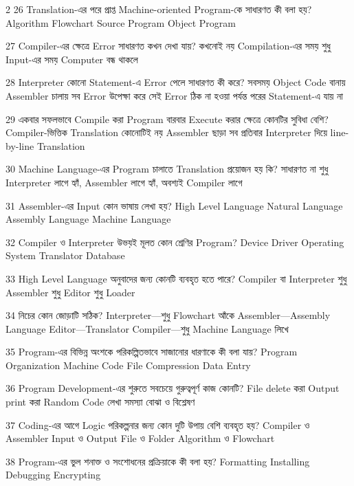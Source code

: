 \begin{multicols}{2}
\mcq
{26}
{Translation-এর পরে প্রাপ্ত Machine-oriented Program-কে সাধারণত কী বলা হয়?}
{Algorithm}
{Flowchart}
{Source Program}
{Object Program}

\mcq
{27}
{Compiler-এর ক্ষেত্রে Error সাধারণত কখন দেখা যায়?}
{কখনোই নয়}
{Compilation-এর সময়}
{শুধু Input-এর সময়}
{Computer বন্ধ থাকলে}

\mcqwide
{28}
{Interpreter কোনো Statement-এ Error পেলে সাধারণত কী করে?}
{সবসময় Object Code বানায়}
{Assembler চালায়}
{সব Error উপেক্ষা করে}
{সেই Error ঠিক না হওয়া পর্যন্ত পরের Statement-এ যায় না}

\mcqwide
{29}
{একবার সফলভাবে Compile করা Program বারবার Execute করার ক্ষেত্রে কোনটির সুবিধা বেশি?}
{Compiler-ভিত্তিক Translation}
{কোনোটিই নয়}
{Assembler ছাড়া সব}
{প্রতিবার Interpreter দিয়ে line-by-line Translation}

\mcqwide
{30}
{Machine Language-এর Program চালাতে Translation প্রয়োজন হয় কি?}
{সাধারণত না}
{শুধু Interpreter লাগে}
{হ্যাঁ, Assembler লাগে}
{হ্যাঁ, অবশ্যই Compiler লাগে}

\mcq
{31}
{Assembler-এর Input কোন ভাষায় লেখা হয়?}
{High Level Language}
{Natural Language}
{Assembly Language}
{Machine Language}

\mcq
{32}
{Compiler ও Interpreter উভয়ই মূলত কোন শ্রেণির Program?}
{Device Driver}
{Operating System}
{Translator}
{Database}

\mcq
{33}
{High Level Language অনুবাদের জন্য কোনটি ব্যবহৃত হতে পারে?}
{Compiler বা Interpreter}
{শুধু Assembler}
{শুধু Editor}
{শুধু Loader}

\mcqwide
{34}
{নিচের কোন জোড়াটি সঠিক?}
{Interpreter—শুধু Flowchart আঁকে}
{Assembler—Assembly Language}
{Editor—Translator}
{Compiler—শুধু Machine Language লিখে}

\mcq
{35}
{Program-এর বিভিন্ন অংশকে পরিকল্পিতভাবে সাজানোর ধারণাকে কী বলা যায়?}
{Program Organization}
{Machine Code}
{File Compression}
{Data Entry}

\mcq
{36}
{Program Development-এর শুরুতে সবচেয়ে গুরুত্বপূর্ণ কাজ কোনটি?}
{File delete করা}
{Output print করা}
{Random Code লেখা}
{সমস্যা বোঝা ও বিশ্লেষণ}

\mcq
{37}
{Coding-এর আগে Logic পরিকল্পনার জন্য কোন দুটি উপায় বেশি ব্যবহৃত হয়?}
{Compiler ও Assembler}
{Input ও Output}
{File ও Folder}
{Algorithm ও Flowchart}

\mcq
{38}
{Program-এর ভুল শনাক্ত ও সংশোধনের প্রক্রিয়াকে কী বলা হয়?}
{Formatting}
{Installing}
{Debugging}
{Encrypting}


\end{multicols}
